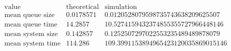 \[\begin{array}{cccc}
 \text{value} & \text{theoretical} & \text{simulation} & \text{} \\
 \text{mean queue size} & 0.0178571 & 0.0120528079598735743638209625507 & \text{} \\
 \text{mean queue time} & 14.2857 & 10.5274159432374855355727966448146 & \text{} \\
 \text{mean system size} & 0.142857 & 0.1252507297022553235489489878079 & \text{} \\
 \text{mean system time} & 114.286 & 109.3991153894965423120035869015146 & \text{} \\
\end{array}\]

